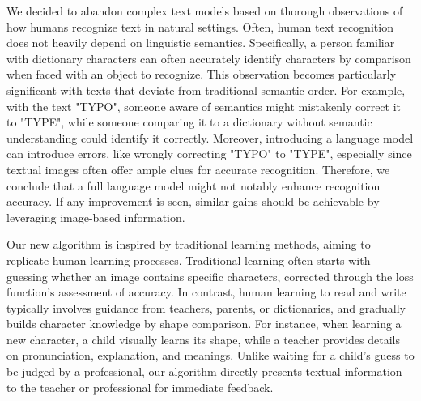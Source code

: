 \documentclass[runningheads]{llncs}
\begin{document}
We decided to abandon complex text models based on thorough observations of how humans recognize text in natural settings.	Often, human text recognition does not heavily depend on linguistic semantics.	Specifically, a person familiar with dictionary characters can often accurately identify characters by comparison when faced with an object to recognize.	This observation becomes particularly significant with texts that deviate from traditional semantic order.	For example, with the text "TYPO", someone aware of semantics might mistakenly correct it to "TYPE", while someone comparing it to a dictionary without semantic understanding could identify it correctly.	Moreover, introducing a language model can introduce errors, like wrongly correcting "TYPO" to "TYPE", especially since textual images often offer ample clues for accurate recognition.	Therefore, we conclude that a full language model might not notably enhance recognition accuracy. If any improvement is seen, similar gains should be achievable by leveraging image-based information.	

Our new algorithm is inspired by traditional learning methods, aiming to replicate human learning processes.	Traditional learning often starts with guessing whether an image contains specific characters, corrected through the loss function's assessment of accuracy.	In contrast, human learning to read and write typically involves guidance from teachers, parents, or dictionaries, and gradually builds character knowledge by shape comparison.	For instance, when learning a new character, a child visually learns its shape, while a teacher provides details on pronunciation, explanation, and meanings.	Unlike waiting for a child's guess to be judged by a professional, our algorithm directly presents textual information to the teacher or professional for immediate feedback.	
\end{document}
